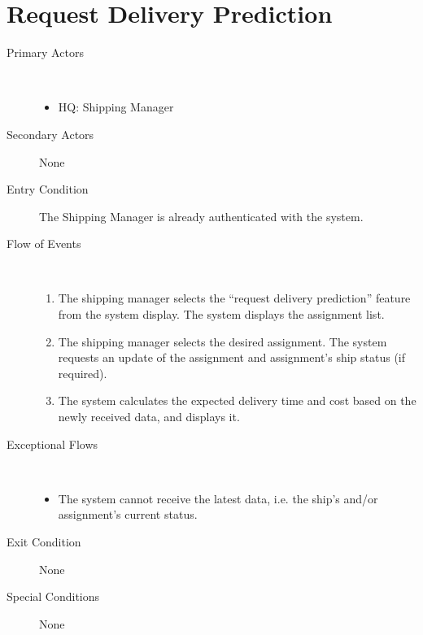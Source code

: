 \documentclass[a4paper,10pt]{report}
\begin{document}
\section{Request Delivery Prediction}
\begin{description}
\item[Primary Actors] \
  \begin{itemize}
  \item HQ: Shipping Manager
  \end{itemize}
\item[Secondary Actors] None
\item[Entry Condition]
  The Shipping Manager is already authenticated with the system.
\item[Flow of Events] \
  \begin{enumerate}
    \item The shipping manager selects the ``request delivery prediction'' feature from the system display. The system displays the assignment list.
    \item The shipping manager selects the desired assignment. The system requests an update of the assignment and assignment's ship status (if required).
    \item The system calculates the expected delivery time and cost based on the newly received data, and displays it.
  \end{enumerate}
\item[Exceptional Flows] \
  \begin{itemize}
  \item The system cannot receive the latest data, i.e. the ship's and/or assignment's current status.
  \end{itemize}
\item[Exit Condition] None
\item[Special Conditions] None
\end{description}
\end{document}
